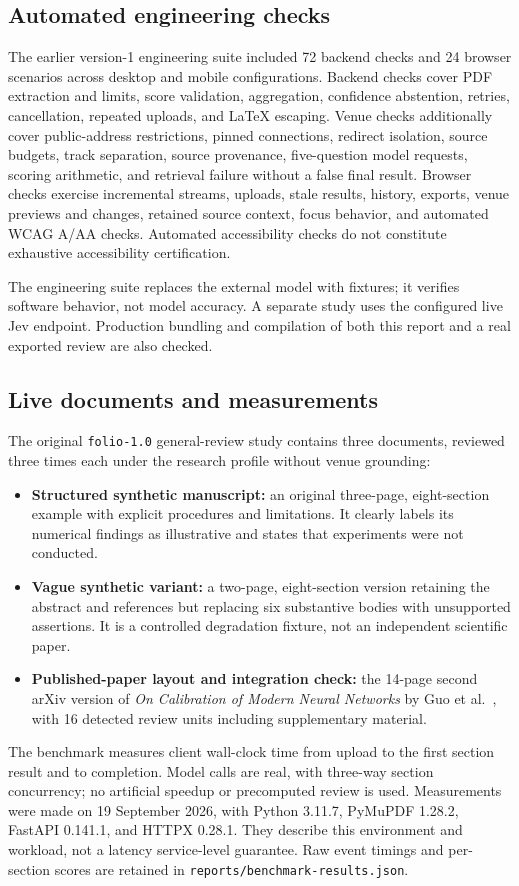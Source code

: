 \documentclass[11pt]{article}
\newcommand{\code}[1]{\texttt{#1}}
\begin{document}
\subsection{Automated engineering checks}
The earlier version-1 engineering suite included 72 backend checks and 24 browser scenarios across desktop and mobile configurations. Backend checks cover PDF extraction and limits, score validation, aggregation, confidence abstention, retries, cancellation, repeated uploads, and LaTeX escaping. Venue checks additionally cover public-address restrictions, pinned connections, redirect isolation, source budgets, track separation, source provenance, five-question model requests, scoring arithmetic, and retrieval failure without a false final result. Browser checks exercise incremental streams, uploads, stale results, history, exports, venue previews and changes, retained source context, focus behavior, and automated WCAG A/AA checks. Automated accessibility checks do not constitute exhaustive accessibility certification.

The engineering suite replaces the external model with fixtures; it verifies software behavior, not model accuracy. A separate study uses the configured live Jev endpoint. Production bundling and compilation of both this report and a real exported review are also checked.

\subsection{Live documents and measurements}
The original \code{folio-1.0} general-review study contains three documents, reviewed three times each under the research profile without venue grounding:
\begin{itemize}
\item \textbf{Structured synthetic manuscript:} an original three-page, eight-section example with explicit procedures and limitations. It clearly labels its numerical findings as illustrative and states that experiments were not conducted.
\item \textbf{Vague synthetic variant:} a two-page, eight-section version retaining the abstract and references but replacing six substantive bodies with unsupported assertions. It is a controlled degradation fixture, not an independent scientific paper.
\item \textbf{Published-paper layout and integration check:} the 14-page second arXiv version of \emph{On Calibration of Modern Neural Networks} by Guo et al.~\cite{guo}, with 16 detected review units including supplementary material.
\end{itemize}
The benchmark measures client wall-clock time from upload to the first section result and to completion. Model calls are real, with three-way section concurrency; no artificial speedup or precomputed review is used. Measurements were made on 19 September 2026, with Python 3.11.7, PyMuPDF 1.28.2, FastAPI 0.141.1, and HTTPX 0.28.1. They describe this environment and workload, not a latency service-level guarantee. Raw event timings and per-section scores are retained in \code{reports/benchmark-results.json}.
\end{document}
